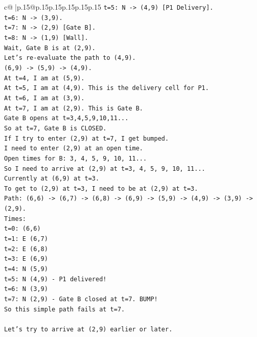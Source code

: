 \documentclass{article}
\begin{document}
{\begin{supertabular}{c@{$\;$}|p{.15\linewidth}@{}p{.15\linewidth}p{.15\linewidth}p{.15\linewidth}p{.15\linewidth}p{.15\linewidth}}
{{{\texttt{t=5: N {-}> (4,9) {[}P1 Delivery{]}.} \\
\texttt{t=6: N {-}> (3,9).} \\
\texttt{t=7: N {-}> (2,9) {[}Gate B{]}.} \\
\texttt{t=8: N {-}> (1,9) {[}Wall{]}.} \\
\texttt{Wait, Gate B is at (2,9).} \\
\texttt{Let's re{-}evaluate the path to (4,9).} \\
\texttt{(6,9) {-}> (5,9) {-}> (4,9).} \\
\texttt{At t=4, I am at (5,9).} \\
\texttt{At t=5, I am at (4,9). This is the delivery cell for P1.} \\
\texttt{At t=6, I am at (3,9).} \\
\texttt{At t=7, I am at (2,9). This is Gate B.} \\
\texttt{Gate B opens at t=3,4,5,9,10,11...} \\
\texttt{So at t=7, Gate B is CLOSED.} \\
\texttt{If I try to enter (2,9) at t=7, I get bumped.} \\
\texttt{I need to enter (2,9) at an open time.} \\
\texttt{Open times for B: 3, 4, 5, 9, 10, 11...} \\
\texttt{So I need to arrive at (2,9) at t=3, 4, 5, 9, 10, 11...} \\
\texttt{Currently at (6,9) at t=3.} \\
\texttt{To get to (2,9) at t=3, I need to be at (2,9) at t=3.} \\
\texttt{Path: (6,6) {-}> (6,7) {-}> (6,8) {-}> (6,9) {-}> (5,9) {-}> (4,9) {-}> (3,9) {-}> (2,9).} \\
\texttt{Times:} \\
\texttt{t=0: (6,6)} \\
\texttt{t=1: E (6,7)} \\
\texttt{t=2: E (6,8)} \\
\texttt{t=3: E (6,9)} \\
\texttt{t=4: N (5,9)} \\
\texttt{t=5: N (4,9) {-} P1 delivered!} \\
\texttt{t=6: N (3,9)} \\
\texttt{t=7: N (2,9) {-} Gate B closed at t=7. BUMP!} \\
\texttt{So this simple path fails at t=7.} \\
\\ 
\texttt{Let's try to arrive at (2,9) earlier or later.} \\
}}}
\end{supertabular}}
\end{document}

